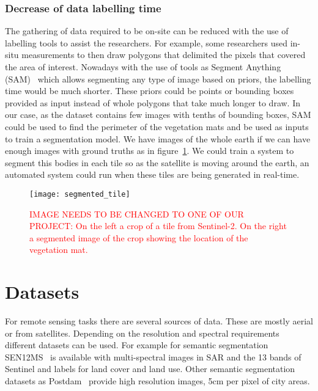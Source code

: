 \documentclass[conference]{IEEEtran}
\begin{document}
    \subsubsection{Decrease of data labelling time}

    The gathering of data required to be on-site can be reduced with the use of labelling tools to assist the researchers.
    For example, some researchers used in-situ measurements to then draw polygons that delimited the pixels that covered the area of interest.
    Nowadays with the use of tools as Segment Anything (SAM)~\cite{kirillov2023segment} which allows segmenting any type of image based on priors, the labelling time would be much shorter.
    These priors could be points or bounding boxes provided as input instead of whole polygons that take much longer to draw.
    In our case, as the dataset contains few images with tenths of bounding boxes, SAM could be used to find the perimeter
    of the vegetation mats and be used as inputs to train a segmentation model.
    We have images of the whole earth if we can have enough images with ground truths as in figure~\ref{fig:tile-segmented}.
    We could train a system to segment this bodies in each tile so as the satellite is moving around the earth, an automated system could run when these tiles are being generated in real-time.

    \begin{figure}[h]
        \centering
        \texttt{[image: segmented\_tile]}
        \caption{\textcolor{red}{IMAGE NEEDS TO BE CHANGED TO ONE OF OUR PROJECT:
        On the left a crop of a tile from Sentinel-2. On the right a segmented image of the crop showing the
        location of the vegetation mat.}}
        \label{fig:tile-segmented}
    \end{figure}


    \section{Datasets}\label{sec:dataset}
    For remote sensing tasks there are several sources of data.
    These are mostly aerial or from satellites.
    Depending on the resolution and spectral requirements different datasets can be used.
    For example for semantic segmentation SEN12MS~\cite{SEN12MS_dataset} is available with multi-spectral images
    in SAR and the 13 bands of Sentinel and labels for land cover and land use.
    Other semantic segmentation datasets as Postdam~\cite{postdam_dataset} provide high resolution images, 5cm per pixel of
    city areas.
\end{document}
